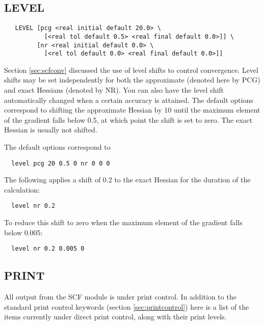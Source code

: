 \subsection{LEVEL}
\label{sec:level}

\begin{verbatim}
   LEVEL [pcg <real initial default 20.0> \
           [<real tol default 0.5> <real final default 0.0>]] \
         [nr <real initial default 0.0> \
           [<rel tol default 0.0> <real final default 0.0>]]
\end{verbatim}

Section \ref{sec:scfconv} discussed the use of level shifts to control
convergence.  Level shifts may be set independently for both the
approximate (denoted here by PCG) and exact Hessians (denoted by
NR).  You can also have the level shift automatically changed when a
certain accuracy is attained.  The default options correspond to 
shifting the approximate Hessian by 10 until the maximum element of
the gradient falls below 0.5, at which point the shift is set to zero.
The exact Hessian is usually not shifted.

The default options correspond to
\begin{verbatim}
  level pcg 20 0.5 0 nr 0 0 0
\end{verbatim}
The following applies a shift of 0.2 to the exact Hessian
for the duration of the calculation:
\begin{verbatim}
  level nr 0.2
\end{verbatim}
To reduce this shift to zero when the maximum element of the gradient
falls below 0.005:
\begin{verbatim}
  level nr 0.2 0.005 0
\end{verbatim}


\subsection{PRINT}

All output from the SCF module is under print control.  In addition to
the standard print control keywords (section \ref{sec:printcontrol}) here
is a list of the items currently under direct print control, along
with their print levels.

